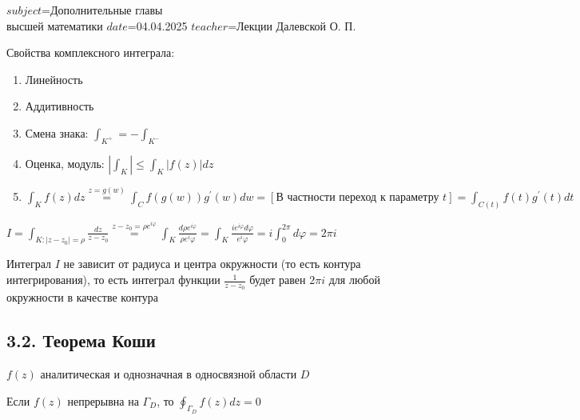 $subject$=Дополнительные главы \\ высшей математики
$date$=04.04.2025
$teacher$=Лекции Далевской О. П.

Свойства комплексного интеграла:

\begin{enumerate}[label*=\arabic*$^\circ$ ]
    \item Линейность
    \item Аддитивность
    \item Смена знака: $\int_{K^+} = - \int_{K^-}$
    \item Оценка, модуль: $\left|\int_K\right| \leq \int_K |f(z)| dz$
    \item $\int_K f(z) dz \overset{z = g(w)}{=} \int_C f(g(w)) g^\prime (w) dw = \left[\text{В частности переход к параметру } t\right] = 
    \int_{C(t)} f(t) g^\prime(t) dt$
\end{enumerate}

\Ex $I = \int_{K : |z - z_0| = \rho} \frac{dz}{z - z_0} \overset{z - z_0 = \rho e^{i\varphi}}{=} \int_K \frac{d\rho e^{i\varphi}}{\rho e^i\varphi} = 
\int_K \frac{i e^{i\varphi} d\varphi}{e^i\varphi} = i \int_0^{2\pi} d\varphi = 2\pi i$

Интеграл $I$ не зависит от радиуса и центра окружности (то есть контура интегрирования), то есть
интеграл функции $\frac{1}{z - z_0}$ будет равен $2\pi i$ для любой окружности в качестве контура 

\subsection{3.2. Теорема Коши}

\hypertarget{cauchy_for_simply_connected_space}{}

\begin{MyTheorem}
     $f(z)$ аналитическая и однозначная в односвязной области $D$

    Если $f(z)$ непрерывна на $\Gamma_D$, то $\oint_{\Gamma_D} f(z) dz = 0$
\end{MyTheorem}

